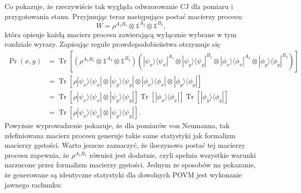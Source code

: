 \documentclass[10pt]{article} %
\DeclareMathOperator{\Trs}{Tr}
\newcommand{\Ket}[1]{|#1\rangle}
\newcommand{\Bra}[1]{\langle#1|}
\newcommand{\I}{\mathbb{1}}
\begin{document}
Co pokazuje, że rzeczywiście tak wygląda odwzorowanie CJ dla pomiaru i przygotowania stanu. 
Przyjmując teraz następująco postać macierzy procesu:
\begin{equation}
W = \rho^{A_1B_1} \otimes \I^{A_2} \otimes \I^{B_2},
\end{equation} która opisuje każdą macierz procesu zawierającą wyłącznie wybrane w tym rozdziale wyrazy. Zapisując regułe prawdopodobieństwa otrzymuje się
\begin{equation}
\begin{split}
\Pr(x,y) &= \Trs\left[ (\rho^{A_1B_1} \otimes \I^{A_2} \otimes \I^{B_2}) (\Ket{\psi_x}\Bra{\psi_x}^{A_1} \otimes \Ket{\psi_y}\Bra{\psi_y}^{B_1} \otimes \Ket{\phi_x}\Bra{\phi_x}^{A_2} \otimes \Ket{\phi_y}\Bra{\phi_y}^{B_2})\right] \\
&= \Trs\left[ \rho \Ket{\psi_x}\Bra{\psi_x}\otimes\Ket{\psi_y}\Bra{\psi_y} \otimes \Ket{\phi_x}\Bra{\phi_x}\otimes\Ket{\phi_y}\Bra{\phi_y}\right] \\
&= \Trs\left[ \rho \Ket{\psi_x}\Bra{\psi_x}\otimes\Ket{\psi_y}\Bra{\psi_y}\right] \Trs\left[\Ket{\phi_x}\Bra{\phi_x}\right] \Trs\left[\Ket{\phi_y}\Bra{\phi_y}\right]
\\
&= \Trs\left[ \rho \Ket{\psi_x}\Bra{\psi_x}\otimes\Ket{\psi_y}\Bra{\psi_y}\right].
\end{split}
\end{equation}
Powyższe wyprowadzenie pokazuje, że dla pomiarów von Neumanna, tak zdefiniowana macierz procesu generuje takie same statystyki jak formalizm macierzy gęstości. Warto jeszcze zaznaczyć, że iloczynowa postać tej macierzy procesu zapewnia, że $\rho^{A_1B_1}$ również jest dodatnie, czyli spełnia wszystkie warunki narzucone przez formalizm macierzy gęstości. Jednym ze sposobów na pokazanie, że generowane są identyczne statystyki dla dowolnych POVM jest wykonanie jawnego rachunku:
\end{document}
